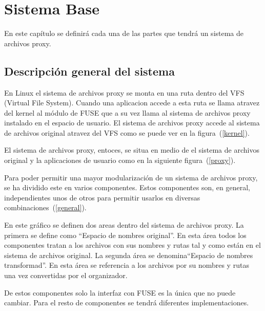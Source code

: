 \chapter{Sistema Base}
\ifpdf
    \graphicspath{{Chapter1/Chapter1Figs/PNG/}{Chapter1/Chapter1Figs/PDF/}{Chapter1/Chapter1Figs/}}
\else
    \graphicspath{{Chapter1/Chapter1Figs/EPS/}{Chapter1/Chapter1Figs/}}
\fi

En este capítulo se definirá cada una de las partes que tendrá un sistema de archivos proxy.

\section{Descripción general del sistema}

En Linux el sistema de archivos proxy se monta en una ruta dentro del VFS (Virtual File System). Cuando una aplicacion accede a esta ruta se llama atravez del kernel al módulo de FUSE que a su vez llama al sistema de archivos proxy instalado en el espacio de usuario. El sistema de archivos proxy accede al sistema de archivos original atravez del VFS como se puede ver en la figura~(\ref{kernel}).


El sistema de archivos proxy, entoces, se situa en medio de el sistema de archivos original y la aplicaciones de usuario como en la siguiente figura~(\ref{proxy}).


Para poder permitir una mayor modularización de un sistema de archivos proxy, se ha dividido este en varios componentes. Estos componentes son, en general, independientes unos de otros para permitir usarlos en diversas combinaciones~(\ref{general}).


En este gráfico se definen dos areas dentro del sistema de archivos proxy. La primera se define como ``Espacio de nombres original''. En esta área todos los componentes tratan a los archivos con sus nombres y rutas tal y como están en el sistema de archivos original. La segunda área se denomina``Espacio de nombres transformad''. En esta área se referencia a los archivos por su nombres y rutas una vez convertidas por el organizador.

De estos componentes solo la interfaz con FUSE es la única que no puede cambiar. Para el resto de componentes se tendrá diferentes implementaciones.


